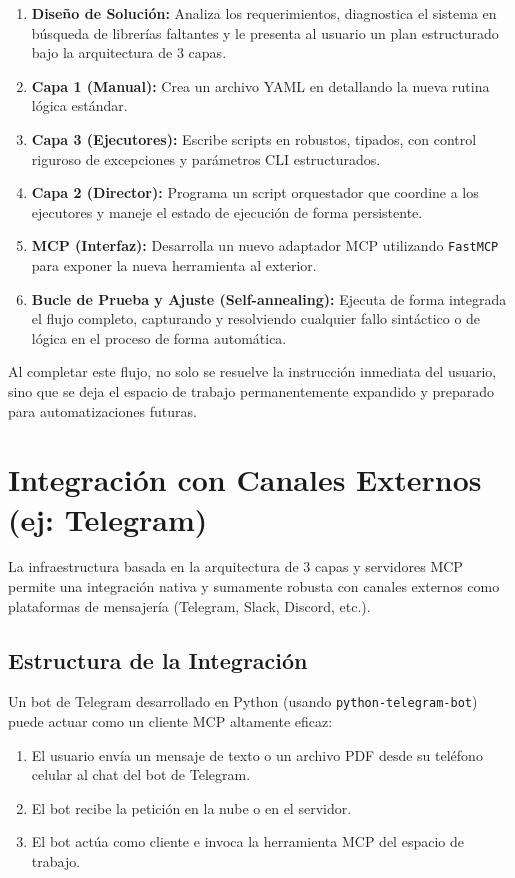 \documentclass[12pt,a4paper]{article}
\begin{document}
\begin{enumerate}
    \item \textbf{Diseño de Solución:} Analiza los requerimientos, diagnostica el sistema en búsqueda de librerías faltantes y le presenta al usuario un plan estructurado bajo la arquitectura de 3 capas.
    \item \textbf{Capa 1 (Manual):} Crea un archivo YAML en  detallando la nueva rutina lógica estándar.
    \item \textbf{Capa 3 (Ejecutores):} Escribe scripts en  robustos, tipados, con control riguroso de excepciones y parámetros CLI estructurados.
    \item \textbf{Capa 2 (Director):} Programa un script orquestador  que coordine a los ejecutores y maneje el estado de ejecución de forma persistente.
    \item \textbf{MCP (Interfaz):} Desarrolla un nuevo adaptador MCP  utilizando \texttt{FastMCP} para exponer la nueva herramienta al exterior.
    \item \textbf{Bucle de Prueba y Ajuste (Self-annealing):} Ejecuta de forma integrada el flujo completo, capturando y resolviendo cualquier fallo sintáctico o de lógica en el proceso de forma automática.
\end{enumerate}

Al completar este flujo, no solo se resuelve la instrucción inmediata del usuario, sino que se deja el espacio de trabajo permanentemente expandido y preparado para automatizaciones futuras.

\section{Integración con Canales Externos (ej: Telegram)}

La infraestructura basada en la arquitectura de 3 capas y servidores MCP permite una integración nativa y sumamente robusta con canales externos como plataformas de mensajería (Telegram, Slack, Discord, etc.).

\subsection{Estructura de la Integración}
Un bot de Telegram desarrollado en Python (usando \texttt{python-telegram-bot}) puede actuar como un cliente MCP altamente eficaz:
\begin{enumerate}
    \item El usuario envía un mensaje de texto o un archivo PDF desde su teléfono celular al chat del bot de Telegram.
    \item El bot recibe la petición en la nube o en el servidor.
    \item El bot actúa como cliente e invoca la herramienta MCP del espacio de trabajo.
\end{enumerate}
\end{document}

